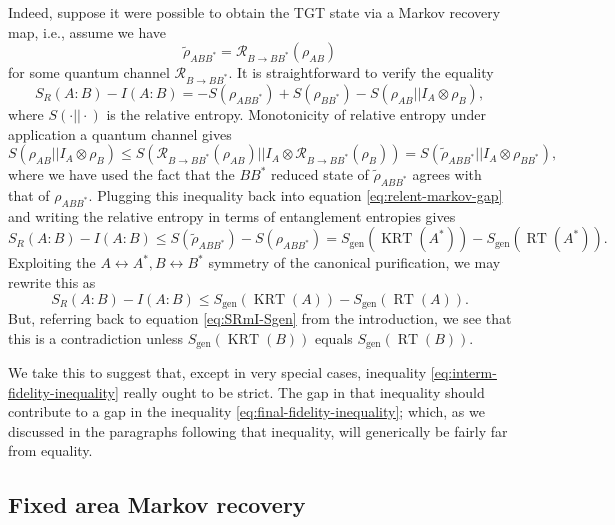 \documentclass[a4paper,11pt]{article}
\renewcommand{\tilde}{\widetilde}
\newcommand{\RT}{\operatorname{RT}}
\newcommand{\KRT}{\operatorname{KRT}}
\begin{document}
Indeed, suppose it were possible to obtain the TGT state via a Markov recovery map, i.e., assume we have
\begin{equation}
    \tilde{\rho}_{ABB^*} = \mathcal{R}_{B \rightarrow B B^*}(\rho_{AB})
\end{equation}
for some quantum channel $\mathcal{R}_{B \rightarrow B B^*}.$ It is straightforward to verify the equality
\begin{equation} \label{eq:relent-markov-gap}
    S_R(A:B) - I(A:B) = - S(\rho_{ABB^*}) + S(\rho_{BB^*}) - S(\rho_{AB}||I_A \otimes \rho_{B}),
\end{equation}
where $S(\cdot||\cdot)$ is the relative entropy. Monotonicity of relative entropy under application a quantum channel gives
\begin{equation}
    S(\rho_{AB}||I_A \otimes \rho_{B})
        \leq S(\mathcal{R}_{B \rightarrow BB^*}(\rho_{AB})|| I_A \otimes \mathcal{R}_{B \rightarrow BB^*}(\rho_{B}))
        = S(\tilde{\rho}_{ABB^*} || I_A \otimes \rho_{BB^*}),
\end{equation}
where we have used the fact that the $BB^*$ reduced state of $\tilde{\rho}_{A BB^*}$ agrees with that of $\rho_{ABB^*}.$ Plugging this inequality back into equation \eqref{eq:relent-markov-gap} and writing the relative entropy in terms of entanglement entropies gives
\begin{equation}
    S_R(A:B) - I(A:B) \leq S(\tilde{\rho}_{ABB^*}) - S(\rho_{ABB^*}) = S_{\text{gen}}(\KRT(A^*)) - S_{\text{gen}}(\RT(A^*)).
\end{equation}
Exploiting the $A \leftrightarrow A^*, B \leftrightarrow B^*$ symmetry of the canonical purification, we may rewrite this as
\begin{equation}
    S_R(A:B) - I(A:B) \leq S_{\text{gen}}(\KRT(A)) - S_{\text{gen}}(\RT(A)).
\end{equation}
But, referring back to equation \eqref{eq:SRmI-Sgen} from the introduction, we see that this is a contradiction unless $S_{\text{gen}}(\KRT(B))$ equals $S_{\text{gen}}(\RT(B)).$

We take this to suggest that, except in very special cases, inequality \eqref{eq:interm-fidelity-inequality} really ought to be strict. The gap in that inequality should contribute to a gap in the inequality \eqref{eq:final-fidelity-inequality}; which, as we discussed in the paragraphs following that inequality, will generically be fairly far from equality.

\subsection{Fixed area Markov recovery}
\label{subsec:fixed-area}
\end{document}
